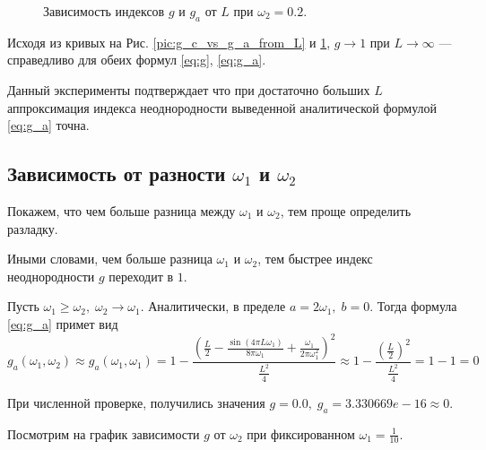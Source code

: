 \documentclass[specialist, substylefile = spbu.rtx,
			   subf, href, 12pt]{disser}
\begin{document}
\begin{figure}[!hhh]
	\caption{Зависимость индексов $ g $ и $ g_a $ от $ L $ при $ \omega_2 = 0.2 $.}
	\label{pic:g_c_vs_g_a_from_L_1}
\end{figure}



Исходя из кривых на Рис. \ref{pic:g_c_vs_g_a_from_L} и \ref{pic:g_c_vs_g_a_from_L_1}, $ g \rightarrow 1 \text{ при } L \rightarrow \infty$ --- справедливо для обеих формул \eqref{eq:g}, \eqref{eq:g_a}. 

Данный эксперименты подтверждает что при достаточно больших $ L $ аппроксимация индекса неоднородности выведенной аналитической формулой \eqref{eq:g_a} точна.

\subsection{Зависимость от разности $\omega_1$ и $ \omega_2 $}
\newtheorem{statement}{Утверждение}

Покажем, что чем больше разница между $ \omega_1 $ и $ \omega_2 $, тем проще определить разладку.

Иными словами, чем больше разница $ \omega_1 $ и $ \omega_2 $, тем быстрее индекс неоднородности $ g $ переходит в $ 1 $.

Пусть $ \omega_1 \geq \omega_2, \; \omega_2 \rightarrow \omega_1 $. Аналитически, в пределе $ a = 2\omega_1,\; b = 0 $. Тогда формула \eqref{eq:g_a} примет вид 
$$ g_a(\omega_1, \omega_2) \approx g_a(\omega_1, \omega_1) = 1 - \frac{(\frac{L}{2} - \frac{\sin(4\pi L\omega_1)}{8\pi\omega_1} + \frac{\omega_1}{2\pi\omega_1^2})^2}{\frac{L^2}{4}} \approx 1 - \frac{(\frac{L}{2})^2}{\frac{L^2}{4}} = 1 - 1 = 0 $$

При численной проверке, получились значения $ g = 0.0,\; g_a = 3.330669e-16 \approx 0 $.

Посмотрим на график зависимости $ g $ от $ \omega_2 $ при фиксированном $ \omega_1 = \frac{1}{10} $.
\end{document}
